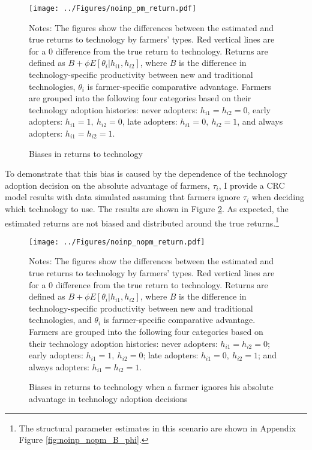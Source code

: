 \documentclass[11pt,letterpaper]{article}
\begin{document}
\begin{figure}[H]
  \centering
  \caption{Biases in returns to technology}
  \texttt{[image: ../Figures/noinp\_pm\_return.pdf]}
  \label{fig:noinp_pm_return}
  \footnotesize
  \begin{tablenotes}
    \item Notes:
      The figures show the differences between the estimated and true returns to technology by farmers' types.
      Red vertical lines are for a 0 difference from the true return to technology.
      Returns are defined as $B + \phi E[\theta_i | h_{i1}, h_{i2}]$, where $B$ is the difference in technology-specific productivity between new and traditional technologies, $\theta_i$ is farmer-specific comparative advantage.
      Farmers are grouped into the following four categories based on their technology adoption histories:
      never adopters: $h_{i1} = h_{i2} = 0$, 
      early adopters: $h_{i1} = 1, \ h_{i2} = 0$, 
      late adopters: $h_{i1} = 0, \ h_{i2} = 1$, and
      always adopters: $h_{i1} = h_{i2} = 1$.
  \end{tablenotes}
\end{figure}

To demonstrate that this bias is caused by the dependence of the technology adoption decision on the absolute advantage of farmers, $\tau_i$, I provide a CRC model results with data simulated assuming that farmers ignore $\tau_i$ when deciding which technology to use.
The results are shown in Figure \ref{fig:noinp_nopm_return}.
As expected, the estimated returns are not biased and distributed around the true returns.\footnote{
  The structural parameter estimates in this scenario are shown in Appendix Figure \ref{fig:noinp_nopm_B_phi}.
}

\begin{figure}[H]
  \centering
  \caption{Biases in returns to technology when a farmer ignores his absolute advantage in technology adoption decisions}
  \texttt{[image: ../Figures/noinp\_nopm\_return.pdf]}
  \label{fig:noinp_nopm_return}
  \footnotesize
  \begin{tablenotes}
    \item Notes:
      The figures show the differences between the estimated and true returns to technology by farmers' types.
      Red vertical lines are for a 0 difference from the true return to technology.
      Returns are defined as $B + \phi E[\theta_i | h_{i1}, h_{i2}]$, where $B$ is the difference in technology-specific productivity between new and traditional technologies, and $\theta_i$ is farmer-specific comparative advantage.
      Farmers are grouped into the following four categories based on their technology adoption histories:
      never adopters: $h_{i1} = h_{i2} = 0$;
      early adopters: $h_{i1} = 1, \ h_{i2} = 0$;
      late adopters: $h_{i1} = 0, \ h_{i2} = 1$; and
      always adopters: $h_{i1} = h_{i2} = 1$.
  \end{tablenotes}
\end{figure}
\end{document}
